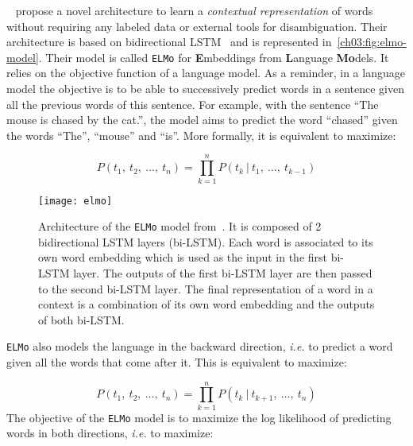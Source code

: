     \citeauthor{peters2018elmo}~\citep{peters2018elmo} propose a novel
    architecture to learn a \textit{contextual representation} of words without
    requiring any labeled data or external tools for disambiguation. Their
    architecture is based on bidirectional LSTM~\citep{huang2015bidirectional}
    and is represented in~\autoref{ch03:fig:elmo-model}. Their model is called
    \texttt{ELMo} for \textbf{E}mbeddings from \textbf{L}anguage
    \textbf{Mo}dels. It relies on the objective function of a language model. As
    a reminder, in a language model the objective is to be able to successively
    predict words in a sentence given all the previous words of this sentence.
    For example, with the sentence ``The mouse is chased by the cat.'', the
    model aims to predict the word ``chased'' given the words ``The'', ``mouse''
    and ``is''. More formally, it is equivalent to maximize:

    \begin{equation}
      P(t_1, ~t_2, ~\dots, ~t_n) = \prod_{k=1}^n P(t_k~|~t_1,~\dots,~t_{k-1})
    \end{equation}

    \begin{figure}[b!]
      \centering
      \texttt{[image: elmo]}
      \caption[Architecture of the \texttt{ELMo} model from
      \citeauthor{peters2018elmo}.] {Architecture of the \texttt{ELMo} model
      from~\citep{peters2018elmo}. It is composed of 2 bidirectional LSTM layers
      (bi-LSTM). Each word is associated to its own word embedding which is
      used as the input in the first bi-LSTM layer. The outputs of the first
      bi-LSTM layer are then passed to the second bi-LSTM layer. The final
      representation of a word in a context is a combination of its own word
      embedding and the outputs of both bi-LSTM.}
      \label{ch03:fig:elmo-model}
    \end{figure}

    \medbreak
    \noindent \texttt{ELMo} also models the language in the backward direction,
    \textit{i.e.} to predict a word given all the words that come after it. This
    is equivalent to maximize:

    \begin{equation}
      P(t_1,~t_2,~\dots,~t_n) = \prod_{k=1}^n P(t_k~|~t_{k+1},~\dots,~t_{n})
    \end{equation}
    The objective of the \texttt{ELMo} model is to maximize the log likelihood
    of predicting words in both directions, \textit{i.e.} to maximize:

